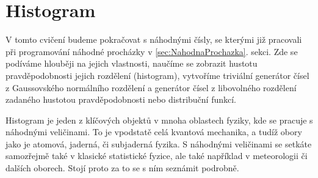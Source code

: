 \documentclass[a4paper,11pt,twoside]{article}
\theoremstyle{red}
\theoremstyle{green}
\begin{document}
\section{Histogram}
    V tomto cvičení budeme pokračovat s náhodnými čísly, se kterými již pracovali při programování náhodné procházky v \ref{sec:NahodnaProchazka}. sekci.
    Zde se podíváme hlouběji na jejich vlastnosti, naučíme se zobrazit hustotu pravděpodobnosti jejich rozdělení (histogram), vytvoříme triviální generátor čísel z Gaussovského normálního rozdělení a generátor čísel z libovolného rozdělení zadaného hustotou pravděpodobnosti nebo distribuční funkcí.
       
    Histogram je jeden z klíčových objektů v mnoha oblastech fyziky, kde se pracuje s náhodnými veličinami.
    To je vpodstatě celá kvantová mechanika, a tudíž obory jako je atomová, jaderná, či subjaderná fyzika.
    S náhodnými veličinami se setkáte samozřejmě také v klasické statistické fyzice, ale také například v meteorologii či dalších oborech.
    Stojí proto za to se s ním seznámit podrobně.
\end{document}
